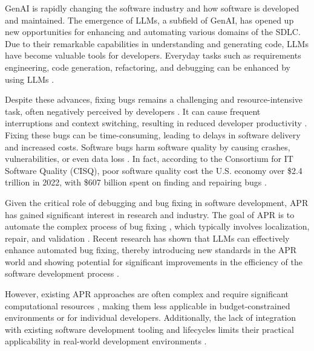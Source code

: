 \ac{GenAI} is rapidly changing the software industry and how software is developed and maintained. The emergence of \acp{LLM}, a subfield of \ac{GenAI}, has opened up new opportunities for enhancing and automating various domains of the \ac{SDLC}. Due to their remarkable capabilities in understanding and generating code, \acp{LLM} have become valuable tools for developers. Everyday tasks such as requirements engineering, code generation, refactoring, and debugging can be enhanced by using \acp{LLM} \cite{houLargeLanguageModels2024, puvvadiCodingAgentsComprehensive2025}.

Despite these advances, fixing bugs remains a challenging and resource-intensive task, often negatively perceived by developers \cite{winterHowDevelopersReally2023}. It can cause frequent interruptions and context switching, resulting in reduced developer productivity \cite{vasilescuSkyNotLimit2016}. Fixing these bugs can be time-consuming, leading to delays in software delivery and increased costs. %
Software bugs harm software quality by causing crashes, vulnerabilities, or even data loss \cite{tihanyiNewEraSoftware2024}. In fact, according to the Consortium for IT Software Quality (CISQ), poor software quality cost the U.S. economy over \$2.4 trillion in 2022, with \$607 billion spent on finding and repairing bugs \cite{CostPoorSoftware}.

Given the critical role of debugging and bug fixing in software development, \ac{APR} has gained significant interest in research and industry. The goal of \ac{APR} is to automate the complex process of bug fixing \cite{houLargeLanguageModels2024}, which typically involves localization, repair, and validation \cite{zhangEmpiricalStudyFactors2012, leeUnifiedDebuggingApproach2024, xiaAgentlessDemystifyingLLMbased2024, zhangPATCHEmpoweringLarge2025, wangEmpiricalResearchUtilizing2025}. Recent research has shown that \acp{LLM} can effectively enhance automated bug fixing, thereby introducing new standards in the APR world and showing potential for significant improvements in the efficiency of the software development process \cite{xiaAgentlessDemystifyingLLMbased2024, liuMarsCodeAgentAInative2024, yangSWEagentAgentComputerInterfaces2024, sobaniaAnalysisAutomaticBug2023, xiaAutomatedProgramRepair2024, huCanGPTO1Kill2024}.

However, existing APR approaches are often complex and require significant computational resources \cite{rondonEvaluatingAgentbasedProgram2025}, making them less applicable in budget-constrained environments or for individual developers. Additionally, the lack of integration with existing software development tooling and lifecycles limits their practical applicability in real-world development environments \cite{chenUnveilingPitfallsUnderstanding2025, liuMarsCodeAgentAInative2024}.


